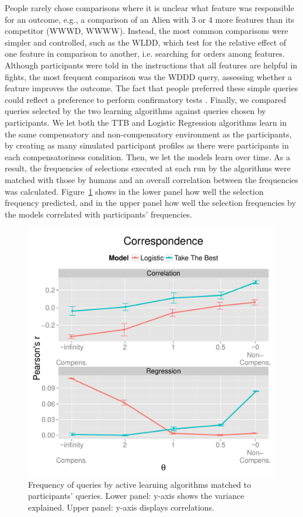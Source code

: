\documentclass[10pt,letterpaper]{article}
\begin{document}
People rarely chose comparisons where it is unclear what feature was responsible for an outcome, e.g., a  comparison of an Alien with 3 or 4 more features than its competitor (WWWD, WWWW). Instead, the most common comparisons were simpler and controlled, such as the WLDD, which test for the relative effect of one feature in comparison to another, i.e. searching for orders among features. Although participants were told in the instructions that all features are helpful in fights, the most frequent comparison was the WDDD query, assessing whether a feature improves the outcome. The fact that people preferred these simple queries could reflect a preference to perform confirmatory tests \citep{markant2012one}. Finally, we compared queries selected by the two learning algorithms against queries chosen by participants. We let both the TTB and Logistic Regression algorithms learn in the same compensatory and non-compensatory environment as the participants, by creating as many simulated participant profiles as there were participants in each compensatoriness condition. Then, we let the models learn over time. As a result, the frequencies of selections executed at each run by the algorithms were matched with those by humans and an overall correlation between the frequencies was calculated. Figure~\ref{result} shows in the lower panel how well the selection frequency predicted, and in the upper panel how well the selection frequencies by the models correlated with participants' frequencies.
\begin{figure}[htb!]
	\centering
\caption{Frequency of queries by active learning algorithms matched to participants' queries. Lower panel:  y-axis shows the variance explained. Upper panel: y-axis displays correlations.}
	\label{result}
	\includegraphics[scale=0.5]{results.pdf}
	
\end{figure}
\end{document}
